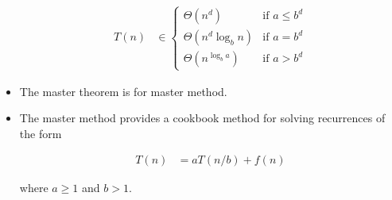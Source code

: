 \documentclass[12pt]{article}
\begin{document}
\begin{itemize}
    \begin{align}
        T(n) &\in \begin{cases}
        \Theta(n^d) & \text{if $a \leq b^d$}\\
        \Theta(n^d\log_b n) & \text{if $a = b^d$}\\
        \Theta(n^{\log_b a}) & \text{if $a > b^d$}
        \end{cases}
    \end{align}

    \item The master theorem is for master method.
    \item The master method provides a cookbook method for solving recurrences
    of the form

    \begin{align}
        T(n) &= aT(n/b) + f(n)
    \end{align}

    \bigskip

    where $a \geq 1$ and $b > 1$.
\end{itemize}
\end{document}
